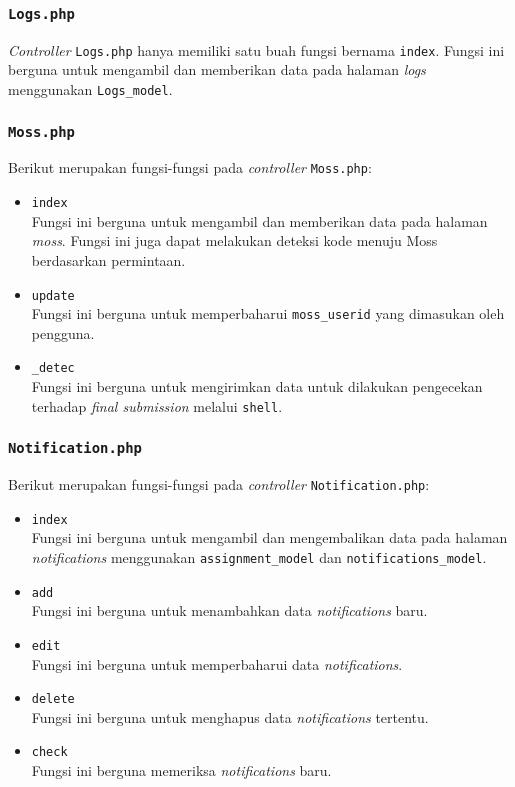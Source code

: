 \subsubsection{\texttt{Logs.php}}
\textit{Controller} \texttt{Logs.php} hanya memiliki satu buah fungsi bernama \texttt{index}. Fungsi ini berguna untuk mengambil dan memberikan data pada halaman \textit{logs} menggunakan \texttt{Logs\_model}.
\subsubsection{\texttt{Moss.php}}
Berikut merupakan fungsi-fungsi pada \textit{controller} \texttt{Moss.php}:
\begin{itemize}
	\item \texttt{index}\\
	Fungsi ini berguna untuk mengambil dan memberikan data pada halaman \textit{moss}. Fungsi ini juga dapat melakukan deteksi kode menuju Moss berdasarkan permintaan.
	\item \texttt{update}\\
	Fungsi ini berguna untuk memperbaharui \texttt{moss\_userid} yang dimasukan oleh pengguna.
	\item \texttt{\_detec}\\
	Fungsi ini berguna untuk mengirimkan data untuk dilakukan pengecekan terhadap \textit{final submission} melalui \texttt{shell}. 
\end{itemize}
\subsubsection{\texttt{Notification.php}}
Berikut merupakan fungsi-fungsi pada \textit{controller} \texttt{Notification.php}:
\begin{itemize}
	\item \texttt{index}\\
	Fungsi ini berguna untuk mengambil dan mengembalikan data pada halaman \textit{notifications} menggunakan \texttt{assignment\_model} dan \texttt{notifications\_model}.
	\item \texttt{add}\\
	Fungsi ini berguna untuk menambahkan data \textit{notifications} baru.
	\item \texttt{edit}\\
	Fungsi ini berguna untuk memperbaharui data \textit{notifications}.
	\item \texttt{delete}\\
	Fungsi ini berguna untuk menghapus data \textit{notifications} tertentu.
	\item \texttt{check}\\
	Fungsi ini berguna memeriksa \textit{notifications} baru.
\end{itemize}

